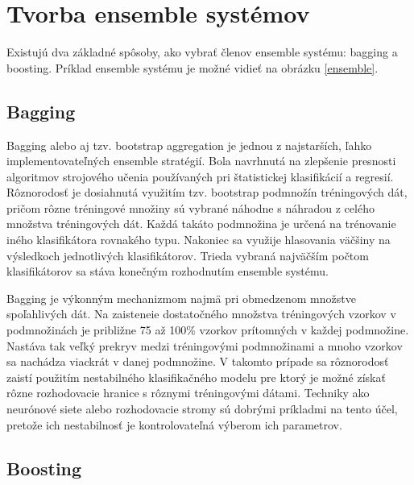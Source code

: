 \section{Tvorba ensemble systémov}

Existujú dva základné spôsoby, ako vybrať členov ensemble systému: bagging a boosting. Príklad ensemble systému je možné vidieť na obrázku \ref{ensemble}.

\subsection{Bagging}

Bagging \cite{breiman2} alebo aj tzv. bootstrap aggregation je jednou z najstarších, ľahko implementovateľných ensemble stratégií. Bola navrhnutá na zlepšenie presnosti algoritmov strojového učenia používaných pri  štatistickej klasifikácií a regresií. Rôznorodosť je dosiahnutá využitím tzv. bootstrap podmnožín tréningových dát, pričom rôzne tréningové množiny sú vybrané náhodne s náhradou z celého množstva tréningových dát. Každá takáto podmnožina je určená na trénovanie iného klasifikátora rovnakého typu. Nakoniec sa využije hlasovania väčšiny na výsledkoch jednotlivých klasifikátorov. Trieda vybraná najväčším počtom klasifikátorov sa stáva konečným rozhodnutím ensemble systému.

Bagging je výkonným mechanizmom najmä pri obmedzenom množstve spoľahlivých dát. Na zaisteneie dostatočného množstva tréningových vzorkov v podmnožinách je približne 75 až 100\% vzorkov prítomných v každej podmnožine. Nastáva tak veľký prekryv medzi tréningovými podmnožinami a mnoho vzorkov sa nachádza viackrát v danej podmnožine. V takomto prípade sa rôznorodosť zaistí použitím nestabilného klasifikačného modelu pre ktorý je možné získať rôzne rozhodovacie hranice s rôznymi tréningovými dátami. Techniky ako neurónové siete alebo rozhodovacie stromy sú dobrými príkladmi na tento účel, pretože ich nestabilnosť je kontrolovateľná výberom ich parametrov.

\subsection{Boosting}

